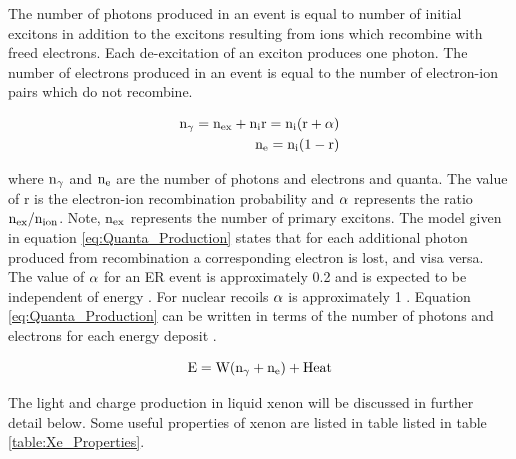 The number of photons produced in an event is equal to number of  initial excitons in addition to the excitons resulting from ions which recombine with freed electrons. Each de-excitation of an exciton produces one photon. The number of electrons produced in an event is equal to the number of electron-ion pairs which do not recombine.

\begin{equation}
\begin{split}
\rm  n_\gamma = n_{ex} + n_i r = n_i (r+\alpha) \\
\rm  n_e = n_i (1-r)
\label{eq:Quanta_Production}
\end{split}
\end{equation}

\noindent where $\rm n_\gamma$ and $\rm n_e$ are the number of photons and electrons and quanta. The value of r is the electron-ion recombination probability and $\rm \alpha$ represents the ratio $\rm n_{ex}/n_{ion}$. Note, $\rm n_{ex}$ represents the number of primary excitons. The model given in equation \ref{eq:Quanta_Production} states that for each additional photon produced from recombination a corresponding electron is lost, and visa versa. The value of $\rm \alpha$ for an ER event is approximately 0.2 and is expected to be independent of energy \cite{Doke_alpha} \cite{alpha_argon}. For nuclear recoils $\rm \alpha$ is approximately 1 \cite{Dahl_Thesis}. Equation \ref{eq:Quanta_Production} can be written in terms of the number of photons and electrons for each energy deposit \cite{Platzman}.

\begin{equation}
\rm E= W (n_\gamma + n_e) + Heat \\
\label{eq:E_Q2}
\end{equation}

\noindent The light and charge production in liquid xenon will be discussed in further detail below. Some useful properties of xenon are listed in table listed in table \ref{table:Xe_Properties}. 

